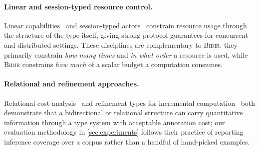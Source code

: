\paragraph{Linear and session-typed resource control.}
Linear capabilities~\cite{fennimore2017linear} and session-typed
actors~\cite{nakashima2018session} constrain resource usage through the
structure of the type itself, giving strong protocol guarantees for
concurrent and distributed settings. These disciplines are complementary
to \textsc{Bidir}: they primarily constrain \emph{how many times} and
\emph{in what order} a resource is used, while \textsc{Bidir} constrains
\emph{how much} of a scalar budget a computation consumes.

\paragraph{Relational and refinement approaches.}
Relational cost analysis~\cite{holsapple2021relational} and refinement
types for incremental computation~\cite{casagrande2015refinement} both
demonstrate that a bidirectional or relational structure can carry
quantitative information through a type system with acceptable
annotation cost; our evaluation methodology in \cref{sec:experiments}
follows their practice of reporting inference coverage over a corpus
rather than a handful of hand-picked examples.
